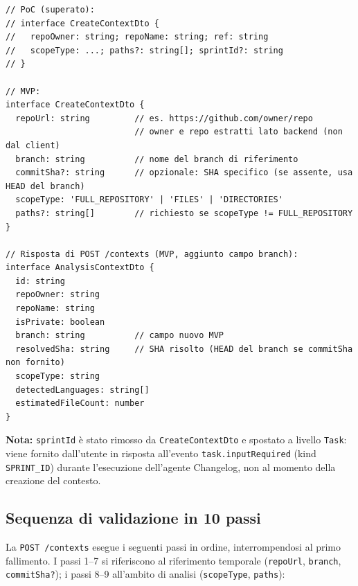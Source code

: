\documentclass[11pt,a4paper]{article}
\begin{document}
\begin{lstlisting}[caption={Evoluzione di \texttt{CreateContextDto} dal PoC all'MVP (BE-ADR-4).}]
// PoC (superato):
// interface CreateContextDto {
//   repoOwner: string; repoName: string; ref: string
//   scopeType: ...; paths?: string[]; sprintId?: string
// }

// MVP:
interface CreateContextDto {
  repoUrl: string         // es. https://github.com/owner/repo
                          // owner e repo estratti lato backend (non dal client)
  branch: string          // nome del branch di riferimento
  commitSha?: string      // opzionale: SHA specifico (se assente, usa HEAD del branch)
  scopeType: 'FULL_REPOSITORY' | 'FILES' | 'DIRECTORIES'
  paths?: string[]        // richiesto se scopeType != FULL_REPOSITORY
}

// Risposta di POST /contexts (MVP, aggiunto campo branch):
interface AnalysisContextDto {
  id: string
  repoOwner: string
  repoName: string
  isPrivate: boolean
  branch: string          // campo nuovo MVP
  resolvedSha: string     // SHA risolto (HEAD del branch se commitSha non fornito)
  scopeType: string
  detectedLanguages: string[]
  estimatedFileCount: number
}
\end{lstlisting}

\textbf{Nota:} \texttt{sprintId} è stato rimosso da \texttt{CreateContextDto} e spostato a livello \texttt{Task}: viene fornito dall'utente in risposta all'evento \texttt{task.inputRequired} (kind \texttt{SPRINT\_ID}) durante l'esecuzione dell'agente Changelog, non al momento della creazione del contesto.

\subsection{Sequenza di validazione in 10 passi}
\label{sec:be-validazione-contesto}

La \texttt{POST /contexts} esegue i seguenti passi in ordine, interrompendosi al primo fallimento. I passi 1--7 si riferiscono al riferimento temporale (\texttt{repoUrl}, \texttt{branch}, \texttt{commitSha?}); i passi 8--9 all'ambito di analisi (\texttt{scopeType}, \texttt{paths}):
\end{document}
